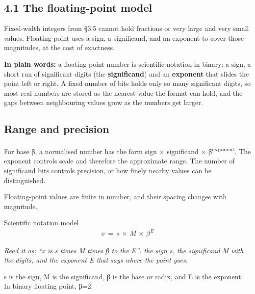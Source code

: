 \documentclass[11pt]{article}
\begin{document}
\begin{keepsection}
\section{4.1 The floating-point model}

Fixed-width integers from §3.5 cannot hold fractions or very large and very small values. Floating point uses a sign, a significand, and an exponent to cover those magnitudes, at the cost of exactness.

\begin{plainbox}\textbf{In plain words:} a floating-point number is scientific notation in binary: a sign, a short run of significant digits (the \textbf{significand}) and an \textbf{exponent} that slides the point left or right. A fixed number of bits holds only so many significant digits, so most real numbers are stored as the nearest value the format can hold, and the gaps between neighbouring values grow as the numbers get larger.\end{plainbox}

\begin{keepsection}
\subsection{Range and precision}

For base β, a normalised number has the form sign \ensuremath{\times} significand \ensuremath{\times} β\textsuperscript{exponent}. The exponent controls scale and therefore the approximate range. The number of significand bits controls precision, or how finely nearby values can be distinguished.

Floating-point values are finite in number, and their spacing changes with magnitude.

\begin{equationcard}{Scientific notation model}
\[ \begin{gathered} {x}\, =\, {s}\, \times \, {M}\, \times \, β^{{E}} \end{gathered} \]
{\small \emph{Read it as: “x is s times M times β to the E”: the sign s, the significand M with the digits, and the exponent E that says where the point goes.}\par s is the sign, M is the significand, β is the base or radix, and E is the exponent. In binary floating point, β=2.}
\end{equationcard}


\end{keepsection}
\end{keepsection}
\end{document}
